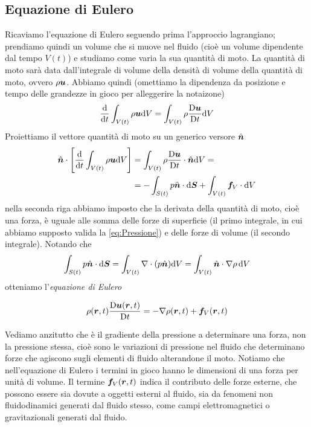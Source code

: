\subsection{Equazione di Eulero} \label{subsec:EquazioneEulero}
Ricaviamo l'equazione di Eulero seguendo prima l'approccio lagrangiano; prendiamo quindi un volume che si muove nel fluido (cioè un volume dipendente dal tempo $V(t)$) e studiamo come varia la sua quantità di moto. La quantità di moto sarà data dall'integrale di volume della densità di volume della quantità di moto, ovvero $\rho \V{u}$. Abbiamo quindi (omettiamo la dipendenza da posizione e tempo delle grandezze in gioco per alleggerire la notaizone)
\begin{align*}
\frac{\dd}{\dd t} \int_{V(t)} \rho \V{u} \dd V = \int_{V(t)} \rho \frac{\DD \V{u}}{\DD t} \dd V
\end{align*}
Proiettiamo il vettore quantità di moto su un generico versore $\V{\hat{n}}$
\begin{align*}
\V{\hat{n}} \cdot \left[ \frac{\dd}{\dd t} \int_{V(t)} \rho \V{u} \dd V \right] & = \int_{V(t)} \rho \frac{\DD \V{u}}{\DD t} \cdot \V{\hat{n}} \dd V = \\
&= - \int_{S(t)} p \V{\hat{n}} \cdot \dd \V{S} + \int_{V(t)} \V{f}_V \cdot \dd V
\end{align*}
nella seconda riga abbiamo imposto che la derivata della quantità di moto, cioè una forza, è uguale alle somma delle forze di superficie (il primo integrale, in cui abbiamo supposto valida la \ref{eq:Pressione}) e delle forze di volume (il secondo integrale).
Notando che 
\begin{align*}
\int_{S(t)} p \V{\hat{n}} \cdot \dd \V{S} = \int_{V(t)} \V{\nabla}\cdot (p \V{\hat{n}}) \dd V = \int_{V(t)} \V{\hat{n}} \cdot \V{\nabla}\rho \, \dd V
\end{align*}
otteniamo l'\textit{equazione di Eulero}
\begin{EQ}
\begin{equation}
\rho(\V{r},t)\frac{\DD \V{u}(\V{r},t)}{\DD t }= -\V{\nabla}\rho(\V{r},t) + \V{f}_V (\V{r},t) \label{eq:EuleroLagrangiana}
\end{equation}
\end{EQ}
Vediamo anzitutto che è il gradiente della pressione a determinare una forza, non la pressione stessa, cioè sono le variazioni di pressione nel fluido che determinano forze che agiscono sugli elementi di fluido alterandone il moto. Notiamo che nell'equazione di Eulero i termini in gioco hanno le dimensioni di una forza per unità di volume. Il termine $\V{f}_V (\V{r},t)$ indica il contributo delle forze esterne, che possono essere sia dovute a oggetti esterni al fluido, sia da fenomeni non fluidodinamici generati dal fluido stesso, come campi elettromagnetici o gravitazionali generati dal fluido.
